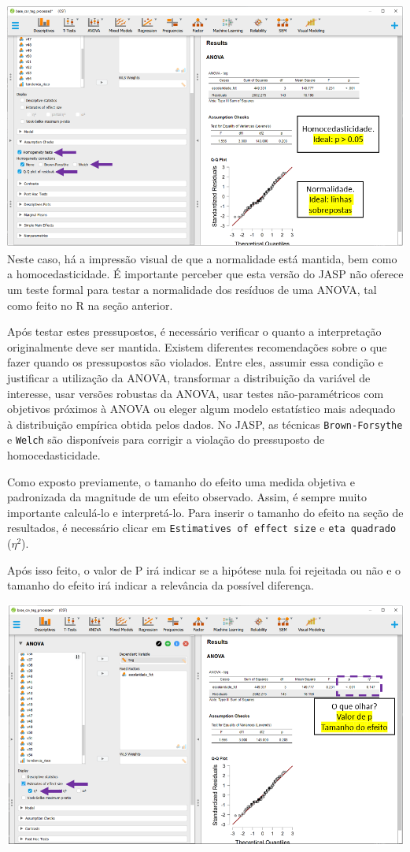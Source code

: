 \documentclass[
]{book}
\begin{document}
\includegraphics{./img/cap_anova_assumptions2.png}
Neste caso, há a impressão visual de que a normalidade está mantida, bem como a homocedasticidade. É importante perceber que esta versão do JASP não oferece um teste formal para testar a normalidade dos resíduos de uma ANOVA, tal como feito no R na seção anterior.

Após testar estes pressupostos, é necessário verificar o quanto a interpretação originalmente deve ser mantida. Existem diferentes recomendações sobre o que fazer quando os pressupostos são violados. Entre eles, assumir essa condição e justificar a utilização da ANOVA, transformar a distribuição da variável de interesse, usar versões robustas da ANOVA, usar testes não-paramétricos com objetivos próximos à ANOVA ou eleger algum modelo estatístico mais adequado à distribuição empírica obtida pelos dados. No JASP, as técnicas \texttt{Brown-Forsythe} e \texttt{Welch} são disponíveis para corrigir a violação do pressuposto de homocedasticidade.

Como exposto previamente, o tamanho do efeito uma medida objetiva e padronizada da magnitude de um efeito observado. Assim, é sempre muito importante calculá-lo e interpretá-lo. Para inserir o tamanho do efeito na seção de resultados, é necessário clicar em \texttt{Estimatives\ of\ effect\ size} e \texttt{eta\ quadrado} (\(\eta^2\)).

Após isso feito, o valor de P irá indicar se a hipótese nula foi rejeitada ou não e o tamanho do efeito irá indicar a relevância da possível diferença.

\includegraphics{./img/cap_anova_resultados.png}
\end{document}
